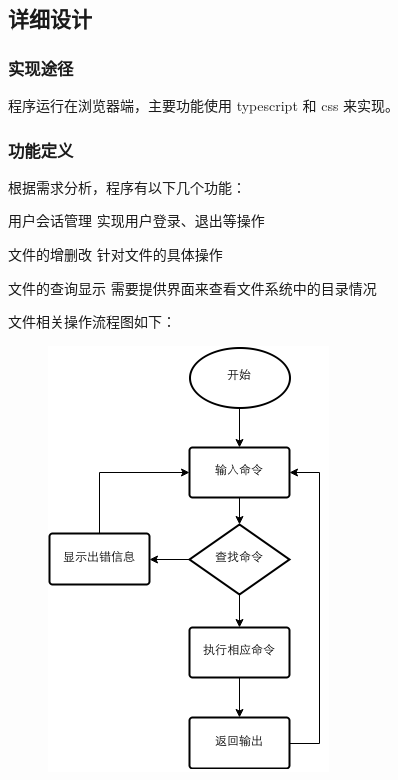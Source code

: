 \documentclass[12bp]{guo}
\begin{document}
\subsection{详细设计}

\subsubsection{实现途径}

程序运行在浏览器端，主要功能使用 typescript 和 css 来实现。

\subsubsection{功能定义}

根据需求分析，程序有以下几个功能：

\begin{description}
    \item{用户会话管理} 实现用户登录、退出等操作
    \item{文件的增删改} 针对文件的具体操作
    \item{文件的查询显示} 需要提供界面来查看文件系统中的目录情况
\end{description}

文件相关操作流程图如下：

\begin{figure}[h!]
    \centering
        \includegraphics[scale=0.75]{figures/fs-app.flow.png}
\end{figure}
\end{document}
